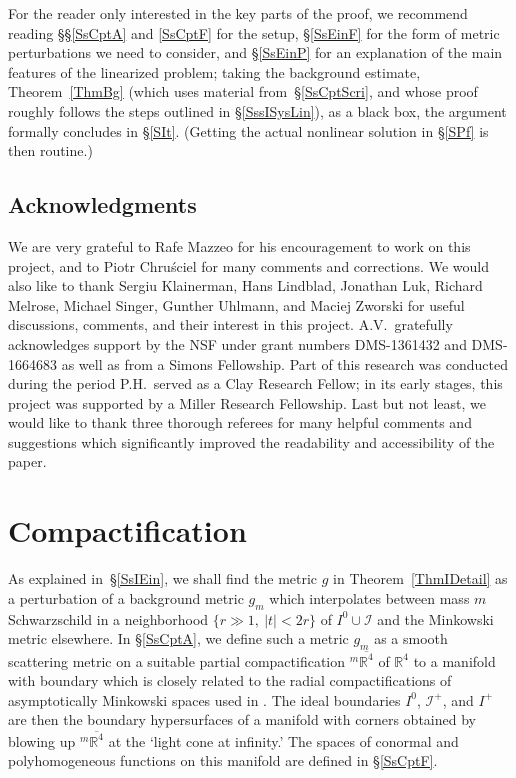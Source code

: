 \documentclass[reqno,11pt,letterpaper]{amsart}
\numberwithin{equation}{section}
\numberwithin{figure}{section}
\theoremstyle{definition}
\theoremstyle{remark}
\newcommand{\ms}{\mathscr}
\newcommand{\scri}{\ms I}
\newcommand{\R}{\mathbb{R}}
\newcommand{\ol}{\overline}
\begin{document}
For the reader only interested in the key parts of the proof, we recommend reading \S\S\ref{SsCptA} and \ref{SsCptF} for the setup, \S\ref{SsEinF} for the form of metric perturbations we need to consider, and \S\ref{SsEinP} for an explanation of the main features of the linearized problem; taking the background estimate, Theorem~\ref{ThmBg} (which uses material from~\S\ref{SsCptScri}, and whose proof roughly follows the steps outlined in \S\ref{SssISysLin}), as a black box, the argument formally concludes in \S\ref{SIt}. (Getting the actual nonlinear solution in \S\ref{SPf} is then routine.)


\subsection*{Acknowledgments}

We are very grateful to Rafe Mazzeo for his encouragement to work on this project, and to Piotr Chru\'sciel for many comments and corrections. We would also like to thank Sergiu Klainerman, Hans Lindblad, Jonathan Luk, Richard Melrose, Michael Singer, Gunther Uhlmann, and Maciej Zworski for useful discussions, comments, and their interest in this project. A.V.\ gratefully acknowledges support by the NSF under grant numbers DMS-1361432 and DMS-1664683 as well as from a Simons Fellowship. Part of this research was conducted during the period P.H.\ served as a Clay Research Fellow; in its early stages, this project was supported by a Miller Research Fellowship. Last but not least, we would like to thank three thorough referees for many helpful comments and suggestions which significantly improved the readability and accessibility of the paper.




\section{Compactification}
\label{SCpt}

As explained in~\S\ref{SsIEin}, we shall find the metric $g$ in Theorem~\ref{ThmIDetail} as a perturbation of a background metric $g_m$ which interpolates between mass $m$ Schwarzschild in a neighborhood $\{r\gg 1,\ |t|<2 r\}$ of $I^0\cup\scri$ and the Minkowski metric elsewhere. In \S\ref{SsCptA}, we define such a metric $g_m$ as a smooth scattering metric on a suitable partial compactification ${}^m\ol{\R^4}$ of $\R^4$ to a manifold with boundary which is closely related to the radial compactifications of asymptotically Minkowski spaces used in \cite{BaskinVasyWunschRadMink,BaskinVasyWunschRadMink2}. The ideal boundaries $I^0$, $\scri^+$, and $I^+$ are then the boundary hypersurfaces of a manifold with corners obtained by blowing up ${}^m\ol{\R^4}$ at the `light cone at infinity.' The spaces of conormal and polyhomogeneous functions on this manifold are defined in \S\ref{SsCptF}.
\end{document}
